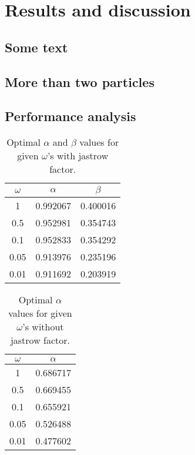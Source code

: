 \documentclass[english, a4paper]{article}
\begin{document}
\section{Results and discussion}


\subsection{Some text}

\subsection{More than two particles}

\subsection{Performance analysis}


\begin{table}[H]
\caption{Optimal $\alpha$ and  $\beta$ values for given $\omega$'s  with jastrow factor.}
\centering
\begin{tabular}{ c c c }
\hline
\hline
  $\omega$ & $\alpha$ & $\beta$ \\
  \hline
1    & 0.992067 & 0.400016\\
0.5  & 0.952981 & 0.354743\\
0.1  & 0.952833 & 0.354292\\
0.05 & 0.913976 & 0.235196\\
0.01 & 0.911692 & 0.203919\\
\hline
\hline
\end{tabular}
\end{table}

\begin{table}[H]
\caption{Optimal $\alpha$ values for given $\omega$'s  without jastrow factor.}
\centering
\begin{tabular}{ c c }
\hline
\hline
  $\omega$ & $\alpha$ \\
  \hline
1    & 0.686717\\
0.5  & 0.669455\\
0.1  & 0.655921\\
0.05 & 0.526488\\
0.01 & 0.477602\\
\hline
\hline
\end{tabular}
\end{table}
\end{document}
